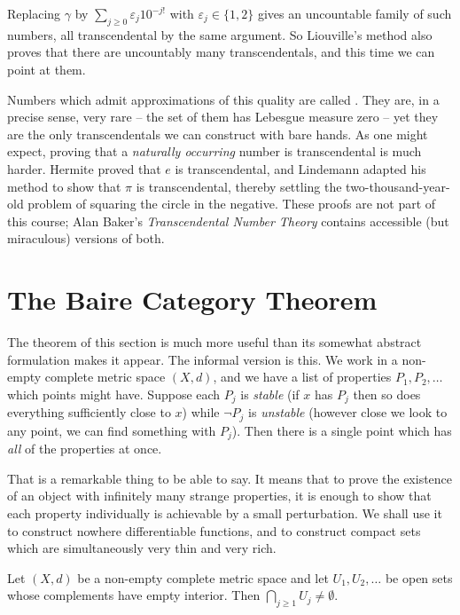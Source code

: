 \documentclass[a4paper]{scrartcl}
\begin{document}
\begin{remark}
	Replacing $\gamma$ by $\sum_{j\geq0}\varepsilon_j10^{-j!}$ with $\varepsilon_j\in\{1,2\}$ gives an uncountable family of such numbers, all transcendental by the same argument. So Liouville's method also proves that there are uncountably many transcendentals, and this time we can point at them.
\end{remark}

Numbers which admit approximations of this quality are called . They are, in a precise sense, very rare -- the set of them has Lebesgue measure zero -- yet they are the only transcendentals we can construct with bare hands. As one might expect, proving that a \emph{naturally occurring} number is transcendental is much harder. Hermite proved that $e$ is transcendental, and Lindemann adapted his method to show that $\pi$ is transcendental, thereby settling the two-thousand-year-old problem of squaring the circle in the negative. These proofs are not part of this course; Alan Baker's \emph{Transcendental Number Theory} contains accessible (but miraculous) versions of both.

\section{The Baire Category Theorem}

The theorem of this section is much more useful than its somewhat abstract formulation makes it appear. The informal version is this. We work in a non-empty complete metric space $(X,d)$, and we have a list of properties $P_1,P_2,\ldots$ which points might have. Suppose each $P_j$ is \emph{stable} (if $x$ has $P_j$ then so does everything sufficiently close to $x$) while $\lnot P_j$ is \emph{unstable} (however close we look to any point, we can find something with $P_j$). Then there is a single point which has \emph{all} of the properties at once.

That is a remarkable thing to be able to say. It means that to prove the existence of an object with infinitely many strange properties, it is enough to show that each property individually is achievable by a small perturbation. We shall use it to construct nowhere differentiable functions, and to construct compact sets which are simultaneously very thin and very rich.

\begin{theorem}\label{thm:baire}
	Let $(X,d)$ be a non-empty complete metric space and let $U_1,U_2,\ldots$ be open sets whose complements have empty interior. Then $\bigcap_{j\geq1}U_j\neq\emptyset$.
\end{theorem}
\end{document}
